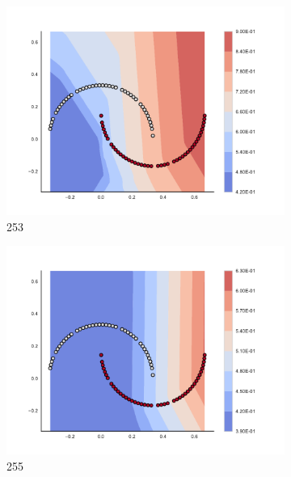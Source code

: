 \begin{figure}[h]
\begin{subfigure}[b]{0.09\textwidth}
    \includegraphics[clip, trim=2.35cm 1.75cm 4.5cm 0cm,width=\textwidth]{img/convergence/253.pdf}
    \caption{253}
    \label{fig:convergence_253}
\end{subfigure}
%
\begin{subfigure}[b]{0.09\textwidth}
    \includegraphics[clip, trim=2.35cm 1.75cm 4.5cm 0cm,width=\textwidth]{img/convergence/255.pdf}
    \caption{255}
    \label{fig:convergence_255}
\end{subfigure}
%
\begin{subfigure}[b]{0.09\textwidth}

\end{subfigure}
\end{figure}
